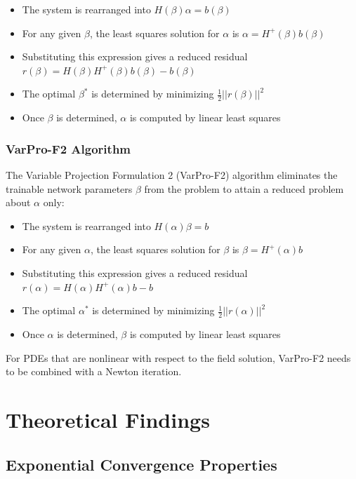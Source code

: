 \documentclass[11pt,a4paper]{article}
\begin{document}
\begin{itemize}
    \item The system is rearranged into $H(\beta)\alpha = b(\beta)$
    \item For any given $\beta$, the least squares solution for $\alpha$ is $\alpha = H^+(\beta)b(\beta)$
    \item Substituting this expression gives a reduced residual $r(\beta) = H(\beta)H^+(\beta)b(\beta) - b(\beta)$
    \item The optimal $\beta^*$ is determined by minimizing $\frac{1}{2}||r(\beta)||^2$
    \item Once $\beta$ is determined, $\alpha$ is computed by linear least squares
\end{itemize}

\subsubsection{VarPro-F2 Algorithm}

The Variable Projection Formulation 2 (VarPro-F2) algorithm eliminates the trainable network parameters $\beta$ from the problem to attain a reduced problem about $\alpha$ only:

\begin{itemize}
    \item The system is rearranged into $H(\alpha)\beta = b$
    \item For any given $\alpha$, the least squares solution for $\beta$ is $\beta = H^+(\alpha)b$
    \item Substituting this expression gives a reduced residual $r(\alpha) = H(\alpha)H^+(\alpha)b - b$
    \item The optimal $\alpha^*$ is determined by minimizing $\frac{1}{2}||r(\alpha)||^2$
    \item Once $\alpha$ is determined, $\beta$ is computed by linear least squares
\end{itemize}

For PDEs that are nonlinear with respect to the field solution, VarPro-F2 needs to be combined with a Newton iteration.

\section{Theoretical Findings}

\subsection{Exponential Convergence Properties}
\end{document}

